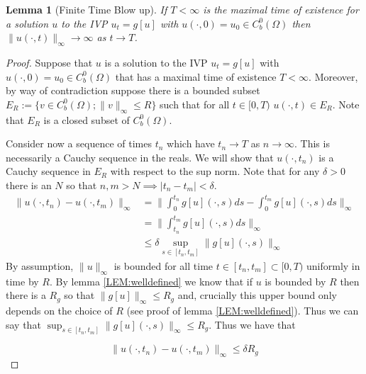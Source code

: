 \documentclass[aps,
preprint,
groupedaddress,
showkeys,
amsmath]{revtex4-2}
\newtheorem{lemma}{Lemma}
\begin{document}
    \begin{lemma}[Finite Time Blow up]\label{LEM:FiniteTimeBlowup}
    If  $T<\infty$ is the maximal time of existence for a solution $u$ to the IVP $u_t=g[u]$ with $u(\cdot,0)=u_0\in C^0_b(\Omega)$ then $\|u(\cdot, t)\|_\infty \rightarrow \infty $ as $t\to T$.
    \end{lemma}

    \begin{proof}
        Suppose that $u$ is a solution to the IVP $u_t=g[u]$ with $u(\cdot, 0)=u_0\in C^0_b(\Omega)$ that has a maximal time of existence $T<\infty$. Moreover, by way of contradiction suppose there is a bounded subset $E_R:=\{v\in C^0_b(\Omega);\|v\|_\infty\leq R\}$ such that for all $t\in [0,T)$ $u(\cdot, t)\in E_R$. Note that $E_{R}$ is  a closed subset of $C^0_b(\Omega).$

        Consider now a sequence of times $t_n$ which have $t_n\to T$ as $n\rightarrow \infty$. This is necessarily a Cauchy sequence in the reals. We will show that $u(\cdot, t_n)$ is a Cauchy sequence in $E_R$ with respect to the sup norm. Note that for any $\delta>0$ there is an $N$ so that $n,m>N\implies |t_n-t_m|<\delta$. 
        \begin{equation*}
            \begin{split}
                \|u(\cdot,t_n)-u(\cdot, t_m)\|_\infty&=\bigg\|\int_0^{t_n}g[u](\cdot, s)ds-\int_0^{t_m}g[u](\cdot,s)ds\bigg\|_\infty\\
                &=\bigg\|\int_{t_n}^{t_m}g[u](\cdot,s)ds\bigg\|_\infty\\
                &\leq \delta \sup_{s\in[t_n,t_m]}\|g[u](\cdot,s)\|_\infty
            \end{split}
        \end{equation*}
        By assumption, $\|u\|_\infty$ is bounded for all time $t\in [t_n,t_m]\subset [0,T)$ uniformly in time by $R$. By lemma \ref{LEM:welldefined} we know that if $u$ is bounded by $R$ then there is a $R_g$ so that $\|g[u]\|_\infty\leq R_g$ and, crucially this upper bound only depends on the choice of $R$ (see proof of lemma \ref{LEM:welldefined}).  Thus we can say that $\sup_{s\in[t_n,t_m]}\|g[u](\cdot,s)\|_\infty\leq R_g$. Thus we have that
        
       \[\|u(\cdot, t_n)-u(\cdot, t_m)\|_\infty\leq \delta R_g\]


\end{proof}
\end{document}

